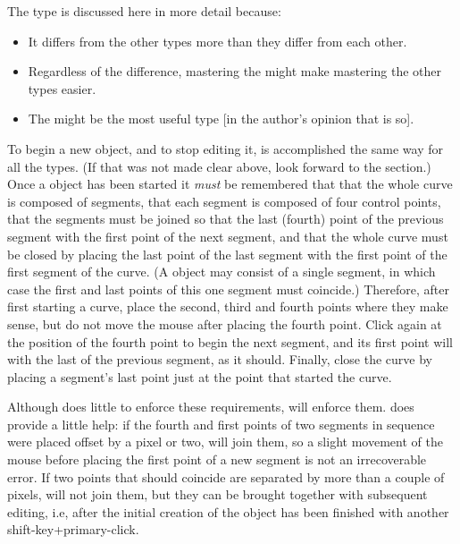 			The \IXbezn{} \IXspline{} type is discussed here in more detail
			because:
			
			\begin{itemize}
				\item It differs from the other types more
						than they differ from each other.
				\item Regardless of the difference, mastering
						the \IXbezn{} might make mastering the
						other types easier.
				\item The \IXbezn{} might be the most
						useful type [in the author's opinion
						that is so].
			\end{itemize}
			
			To begin a new object, and to stop editing it,
			is accomplished the same way for all the \IXspline{} types.
			(If that was not made
			clear above, look forward to the
			 section.)
			Once a \IXbezn{} \IXspline{} object has been started
			it \emph{must} be remembered that that the whole
			curve is composed of segments, that each segment
			is composed of four control points, that the
			segments must be joined so that the last (fourth) point
			of the previous segment  with
			the first point of the next segment,
			and that the whole curve must be closed by
			placing the last point of the last segment
			 with the first point
			of the first segment of the curve.
			(A \IXbezn{} \IXspline{} object
			may consist of a single segment, in which case
			the first and last points of this one segment
			must coincide.) Therefore, after first starting
			a \IXbezn{} curve, place the second, third and
			fourth points where they make sense, but do not
			move the mouse after placing the fourth point.
			Click again at the position of the fourth point
			to begin the next segment, and its
			first point will  with the
			last of the previous segment, as it should.
			Finally, close the curve by placing a segment's
			last point just at the point that started the curve.
			
			Although \IXpkg{} does little to enforce these
			requirements, \IXpov{} will enforce them.
			\IXpkgu{} does provide a little help: if the
			fourth and first points of two segments in
			sequence were placed offset by a pixel or two,
			\IXpkg{} will join them, so a slight movement
			of the mouse before placing the first point
			of a new segment is not an irrecoverable error.
			If two points that should coincide are separated
			by more than a couple of pixels,
			\IXpkg{} will not join them, but they can be brought
			together with subsequent editing, i.e, after the
			initial creation of the object has been
			finished with another shift-key+primary-click.
			
